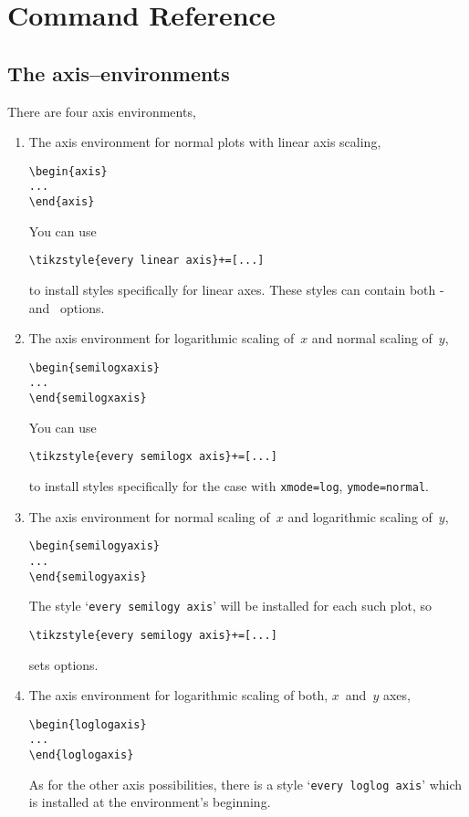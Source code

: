 
\section{Command Reference}
\subsection{The axis--environments}
There are four axis environments,
\begin{enumerate}
\item The axis environment for normal plots with linear axis scaling,
\begin{lstlisting}
\begin{axis}
...
\end{axis}
\end{lstlisting}
You can use
\begin{lstlisting}
\tikzstyle{every linear axis}+=[...]
\end{lstlisting}
to install styles specifically for linear axes. These styles can contain both \Tikz- and \PGFPlots\ options.

\item The axis environment for logarithmic scaling of~$x$ and normal scaling of~$y$,
\begin{lstlisting}
\begin{semilogxaxis}
...
\end{semilogxaxis}
\end{lstlisting}
You can use
\begin{lstlisting}
\tikzstyle{every semilogx axis}+=[...]
\end{lstlisting}
to install styles specifically for the case with \texttt{xmode=log}, \texttt{ymode=normal}.

\item The axis environment for normal scaling of~$x$ and logarithmic scaling of~$y$,
\begin{lstlisting}
\begin{semilogyaxis}
...
\end{semilogyaxis}
\end{lstlisting}
The style `\texttt{every semilogy axis}' will be installed for each such plot, so
\begin{lstlisting}
\tikzstyle{every semilogy axis}+=[...]
\end{lstlisting}
sets options.

\item The axis environment for logarithmic scaling of both, $x$~and~$y$ axes,
\begin{lstlisting}
\begin{loglogaxis}
...
\end{loglogaxis}
\end{lstlisting}
As for the other axis possibilities, there is a style `\texttt{every loglog axis}' which is installed at the environment's beginning.
\end{enumerate}

